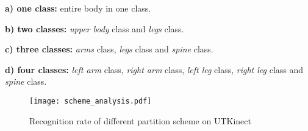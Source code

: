\documentclass[conference]{IEEEtran}
\begin{document}
			\textbf{a) one class:} entire body in one class.
			
			\textbf{b) two classes:} \textit{upper body} class and \textit{legs} class.
			
			\textbf{c) three classes:} \textit{arms} class, \textit{legs} class and \textit{spine} class.
			
			\textbf{d) four classes:} \textit{left arm} class, \textit{right arm} class, \textit{left leg} class, \textit{right leg} class and \textit{spine} class.
			
			\begin{figure}[h]
				\centering
				\texttt{[image: scheme\_analysis.pdf]}
				\caption{Recognition rate of different partition scheme on UTKinect}
				\label{fig:scheme_analysis}
			\end{figure}
			
\end{document}
